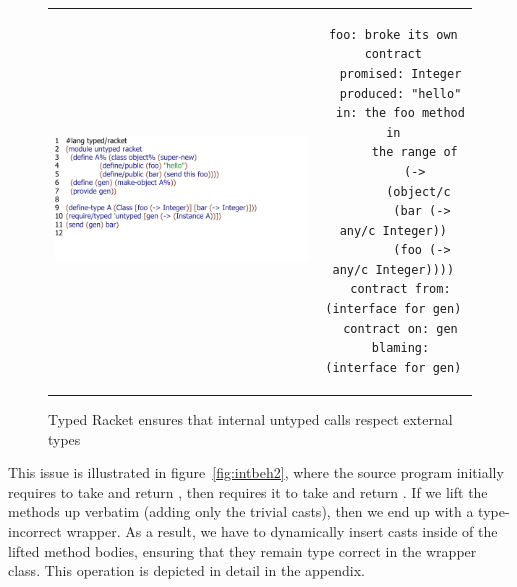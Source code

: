 \documentclass[a4paper,USenglish]{tex/lipics-v2016}
\begin{document}
\begin{figure}
\begin{tabular}{cc}
\includegraphics[scale=.7]{figures/internal.pdf}&\hspace{-2cm}
\begin{minipage}{.5\textwidth}
\vspace{-4.3cm}
\tiny
\begin{lstlisting}[basicstyle=\scriptsize\ttfamily]
foo: broke its own contract
  promised: Integer
  produced: "hello"
  in: the foo method in
      the range of
      (->
       (object/c
        (bar (-> any/c Integer))
        (foo (-> any/c Integer))))
  contract from: (interface for gen)
  contract on: gen
  blaming: (interface for gen)
\end{lstlisting}
\end{minipage}
\end{tabular}
\caption{Typed Racket ensures that internal untyped calls respect external types}
\label{fig:arktex3}
\end{figure}

This issue is illustrated in figure~\ref{fig:intbeh2}, where the source program
initially requires \n to take  and return , then requires it to take
and return . If we lift the methods up verbatim (adding only the trivial
casts), then we end up with a type-incorrect wrapper. As a result, we have to
dynamically insert casts inside of the lifted method bodies, ensuring that they
remain type correct in the wrapper class. This operation is depicted in detail
in the appendix.
\end{document}
